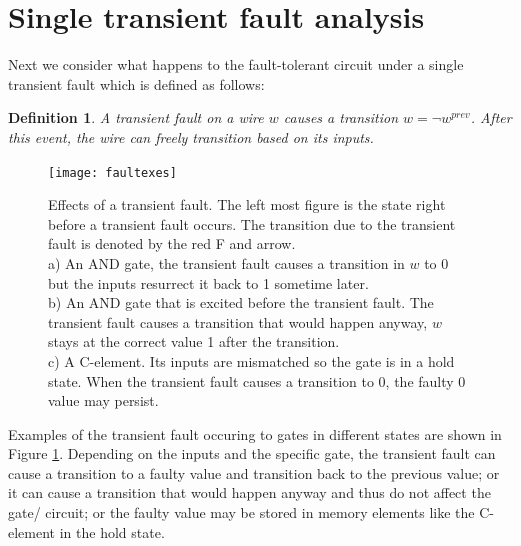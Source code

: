 \documentclass[12pt]{report}
\newtheorem*{definition}{Definition}
\begin{document}
\section{Single transient fault analysis}
Next we consider what happens to the fault-tolerant circuit under a single transient fault which is defined as follows:
\begin{definition}A {\em transient fault} on a wire $w$ causes a transition $w= \lnot w^{prev}$.  After this event, the wire can freely transition based on its inputs. %
\end{definition}
\begin{figure}
  \centering
    \texttt{[image: faultexes]}
  \caption{Effects of a transient fault.  The left most figure is the state right before a transient fault occurs.  The transition due to the transient fault is denoted by the red F and arrow.   \\
  a) An AND gate, the transient fault causes a transition in $w$ to 0 but the inputs resurrect it back to 1 sometime later.   \\
  b) An AND gate that is excited before the transient fault.  The transient fault causes a transition that would happen anyway, $w$ stays at the correct value 1 after the transition.\\
  c) A C-element.  Its inputs are mismatched so the gate is in a hold state.  When the transient fault causes a transition to 0, the faulty 0 value may persist.
  }
  \label{fig:faultx}
\end{figure}
Examples of the transient fault occuring to gates in different states are shown in Figure \ref{fig:faultx}.  Depending on the inputs and the specific gate, the transient fault can cause a transition to a faulty value and transition back to the previous value; or it can cause a transition that would happen anyway and thus do not affect the gate/ circuit; or the faulty value may be stored in memory elements like the C-element in the hold state.
\end{document}
